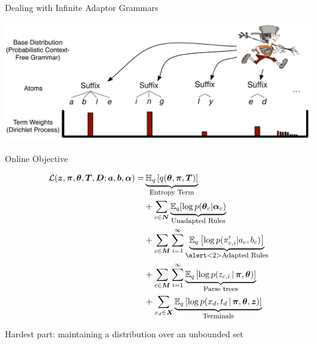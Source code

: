 \begin{frame}{Dealing with Infinite Adaptor Grammars}
  \begin{center}
      \includegraphics[width=.9\linewidth]{onlineag/dp_johnny}

  \end{center}

\end{frame}



\begin{frame}{Online Objective}

\begin{align}
\elbo ( \boldsymbol{z}, \boldsymbol{\pi}, \boldsymbol{\theta},
  \boldsymbol{T}, \boldsymbol{D}; \boldsymbol{a}, \boldsymbol{b},
  \boldsymbol{\alpha}) = & \explain{Entropy Term}{\h{q}{ q( \boldsymbol{\theta}, \boldsymbol{\pi}, \boldsymbol{T} ) }} \notag \\
  & +  \sum_{c \in \boldsymbol{N}} \explain{Unadapted Rules}{\mathbb{E}_q [ \log{ p(
    \boldsymbol{\theta}_c | \boldsymbol{\alpha}_c ) } } \notag \\
  &  + \sum_{c \in \boldsymbol{M}} \sum_{i=1}^{\infty}
  \explain{\alert<2>{Adapted Rules}}{\e{q}{ \log{   p ( \pi^{\prime}_{c, i} | a_c, b_c
    ) } }} \notag \\
  &  + \sum_{c \in \boldsymbol{M}} \sum_{i=1}^{\infty}
  \explain{Parse trees}{\e{q}{ \log{ p ( z_{c, i} \g \boldsymbol{\pi},
    \boldsymbol{\theta} ) } } } \notag \\
  &  + \sum_{x_d \in \boldsymbol{X}} \explain{Terminals} {\e{q}{\log{ p (
    x_d, t_d \g \boldsymbol{\pi}, \boldsymbol{\theta}, \boldsymbol{z}) }
  }} \notag
\end{align}

Hardest part: maintaining a distribution over an unbounded set

\end{frame}


